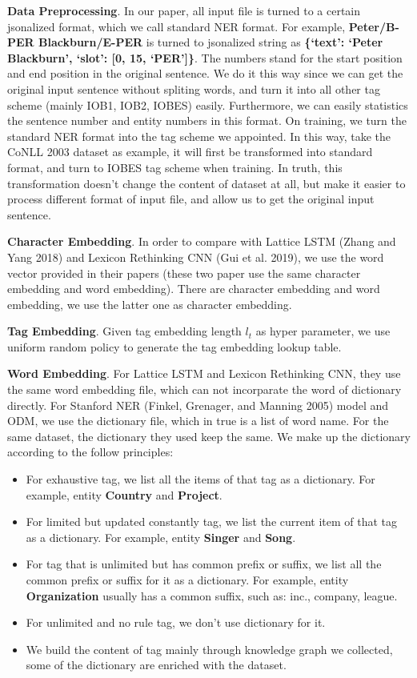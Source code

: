\documentclass[letterpaper]{article} %
\begin{document}
\textbf{Data Preprocessing}. In our paper, all input file is turned to a certain jsonalized format, which we call standard NER format. For example, \textbf{Peter/B-PER Blackburn/E-PER} is turned to jsonalized string as \textbf{\{‘text’: ‘Peter Blackburn’, ‘slot’: [0, 15, ‘PER’]\}}. The numbers stand for the start position and end position in the original sentence. We do it this way since we can get the original input sentence without spliting words, and turn it into all other tag scheme (mainly IOB1, IOB2, IOBES) easily. Furthermore, we can easily statistics the sentence number and entity numbers in this format. On training, we turn the standard NER format into the tag scheme we appointed. In this way, take the CoNLL 2003 dataset as example, it will first be transformed into standard format, and turn to IOBES tag scheme when training. In truth, this transformation doesn't change the content of dataset at all, but make it easier to process different format of input file, and allow us to get the original input sentence.

\textbf{Character Embedding}. In order to compare with Lattice LSTM (Zhang and Yang 2018) and Lexicon Rethinking CNN (Gui et al. 2019), we use the word vector provided in their papers (these two paper use the same character embedding and word embedding). There are character embedding and word embedding, we use the latter one as character embedding.

\textbf{Tag Embedding}. Given tag embedding length $l_t$ as hyper parameter, we use uniform random policy to generate the tag embedding lookup table. 

\textbf{Word Embedding}. For Lattice LSTM and Lexicon Rethinking CNN, they use the same word embedding file, which can not incorparate the word of dictionary directly. For Stanford NER (Finkel, Grenager, and Manning 2005) model and ODM, we use the dictionary file, which in true is a list of word name. For the same dataset, the dictionary they used keep the same. We make up the dictionary according to the follow principles:

\begin{itemize}
\item For exhaustive tag, we list all the items of that tag as a dictionary. For example, entity \textbf{Country} and \textbf{Project}.
\item For limited but updated constantly tag, we list the current item of that tag as a dictionary. For example, entity \textbf{Singer} and \textbf{Song}.
\item For tag that is unlimited but has common prefix or suffix, we list all the common prefix or suffix for it as a dictionary. For example, entity \textbf{Organization} usually has a common suffix, such as: inc., company, league.
\item For unlimited and no rule tag, we don't use dictionary for it.
\item We build the content of tag mainly through knowledge graph we collected, some of the dictionary are enriched with the dataset.
\end{itemize}
\end{document}
